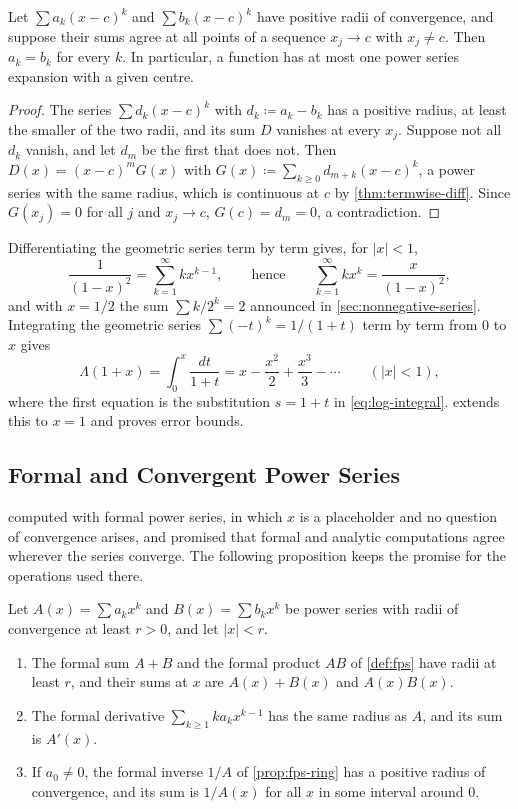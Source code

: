 \begin{corollary}
\label{cor:power-series-unique}
Let $\sum a_k(x-c)^k$ and $\sum b_k(x-c)^k$ have positive radii of convergence, and suppose their sums agree at all points of a sequence $x_j\to c$ with $x_j\ne c$. Then $a_k=b_k$ for every $k$. In particular, a function has at most one power series expansion with a given centre.
\end{corollary}

\begin{proof}
The series $\sum d_k(x-c)^k$ with $d_k\coloneqq a_k-b_k$ has a positive radius, at least the smaller of the two radii, and its sum $D$ vanishes at every $x_j$. Suppose not all $d_k$ vanish, and let $d_m$ be the first that does not. Then $D(x)=(x-c)^mG(x)$ with $G(x)\coloneqq\sum_{k\ge0}d_{m+k}(x-c)^k$, a power series with the same radius, which is continuous at $c$ by \cref{thm:termwise-diff}. Since $G(x_j)=0$ for all $j$ and $x_j\to c$, $G(c)=d_m=0$, a contradiction.
\end{proof}

Differentiating the geometric series term by term gives, for $|x|<1$,
\[
\frac1{(1-x)^2}=\sum_{k=1}^\infty kx^{k-1},\qquad\text{hence}\qquad\sum_{k=1}^\infty kx^k=\frac x{(1-x)^2},
\]
and with $x=1/2$ the sum $\sum k/2^k=2$ announced in \cref{sec:nonnegative-series}. Integrating the geometric series $\sum(-t)^k=1/(1+t)$ term by term from $0$ to $x$ gives
\[
\Lambda(1+x)=\int_0^x\frac{dt}{1+t}=x-\frac{x^2}2+\frac{x^3}3-\cdots\qquad(|x|<1),
\]
where the first equation is the substitution $s=1+t$ in \eqref{eq:log-integral}.  extends this to $x=1$ and proves error bounds.

\subsection{Formal and Convergent Power Series}

 computed with formal power series, in which $x$ is a placeholder and no question of convergence arises, and promised that formal and analytic computations agree wherever the series converge. The following proposition keeps the promise for the operations used there.

\begin{proposition}
\label{prop:formal-analytic}
Let $A(x)=\sum a_kx^k$ and $B(x)=\sum b_kx^k$ be power series with radii of convergence at least $r>0$, and let $|x|<r$.
\begin{enumerate}
\item The formal sum $A+B$ and the formal product $AB$ of \cref{def:fps} have radii at least $r$, and their sums at $x$ are $A(x)+B(x)$ and $A(x)B(x)$.
\item The formal derivative $\sum_{k\ge1}ka_kx^{k-1}$ has the same radius as $A$, and its sum is $A'(x)$.
\item If $a_0\ne0$, the formal inverse $1/A$ of \cref{prop:fps-ring} has a positive radius of convergence, and its sum is $1/A(x)$ for all $x$ in some interval around $0$.
\end{enumerate}
\end{proposition}

